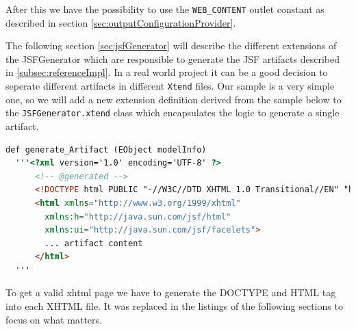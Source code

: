 After this we have the possibility to use the \texttt{WEB\_CONTENT} outlet
constant as described in section \ref{sec:outputConfigurationProvider}.\newline

The following section \ref{sec:jsfGenerator} will describe the different
extensions of the JSFGenerator which are responsible to generate the JSF artifacts described in
\ref{subsec:referenceImpl}. In a real world project it can be a good decision to
seperate different artifacts in different \texttt{Xtend} files. Our sample is a
very simple one, so we will add a new extension definition derived from the
sample below to the \texttt{JSFGenerator.xtend} class which encapsulates the
logic to generate a single artifact.

\begin{lstlisting}[language=HTML] 
  def generate_Artifact (EObject modelInfo)
  '''<?xml version='1.0' encoding='UTF-8' ?>
      <!-- @generated -->
      <!DOCTYPE html PUBLIC "-//W3C//DTD XHTML 1.0 Transitional//EN" "http://www.w3.org/TR/xhtml1/DTD/xhtml1-transitional.dtd">
      <html xmlns="http://www.w3.org/1999/xhtml"
        xmlns:h="http://java.sun.com/jsf/html"
        xmlns:ui="http://java.sun.com/jsf/facelets">
     	... artifact content
      </html>
  '''
\end{lstlisting}

To get a valid xhtml page we have to generate the DOCTYPE
and HTML tag into each XHTML file. It was replaced in the 
listings of the following sections to focus on what matters.